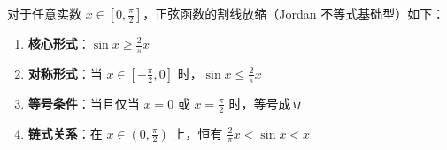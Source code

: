 \begin{statementbox}
对于任意实数 $x \in [0, \frac{\pi}{2}]$，正弦函数的割线放缩（Jordan 不等式基础型）如下：
\begin{enumerate}
    \item \textbf{核心形式}：$\sin x \geqslant \frac{2}{\pi}x$
    \item \textbf{对称形式}：当 $x \in [-\frac{\pi}{2}, 0]$ 时，$\sin x \leqslant \frac{2}{\pi}x$
    \item \textbf{等号条件}：当且仅当 $x = 0$ 或 $x = \frac{\pi}{2}$ 时，等号成立
    \item \textbf{链式关系}：在 $x \in (0, \frac{\pi}{2})$ 上，恒有 $\frac{2}{\pi}x < \sin x < x$
\end{enumerate}
\end{statementbox}